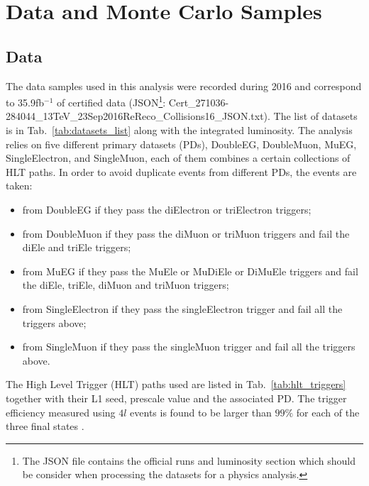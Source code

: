 \chapter{Data and Monte Carlo Samples}
\label{sec:datasets}
\section{Data}
The data samples used in this analysis were recorded during 2016 and correspond to 35.9fb$^{-1}$ of certified data (JSON\footnote{The JSON file contains the official runs and luminosity section which should be consider when processing the datasets for a physics analysis.}: {\footnotesize Cert\_271036-284044\_13TeV\_23Sep2016ReReco\_Collisions16\_JSON.txt}).
The list of datasets is in Tab.~\ref{tab:datasets_list} along with the integrated luminosity. The analysis relies on five different primary datasets (PDs), DoubleEG, DoubleMuon, MuEG, SingleElectron, and SingleMuon, each of them combines a certain collections of HLT paths. In order to avoid duplicate events from different PDs, the events are taken:

\begin{itemize}
	\item from DoubleEG if they pass the diElectron or triElectron triggers;
	\item from DoubleMuon if they pass the diMuon or triMuon triggers and fail the diEle and triEle triggers;
	\item from MuEG if they pass the MuEle or MuDiEle or DiMuEle triggers and fail the diEle, triEle, diMuon and triMuon triggers;
	\item from SingleElectron if they pass the singleElectron trigger and fail all the triggers above;
	\item from SingleMuon if they pass the singleMuon trigger and fail all the triggers above.
\end{itemize}

The High Level Trigger (HLT) paths used are listed in Tab.~\ref{tab:hlt_triggers} together with their L1 seed, prescale value and the associated PD. The trigger efficiency measured using $4l$ events is found to be larger than $99\%$ for each of the three final states \cite{bib:CMS-AN-16-328}. 

